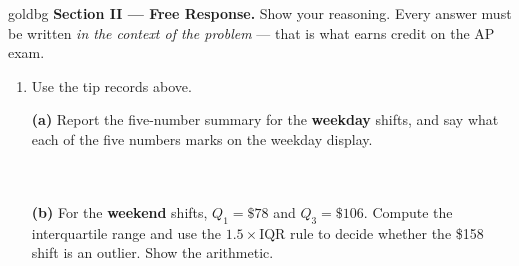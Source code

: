 \documentclass[12pt]{article}
\begin{document}
\vspace{0.14in}

\boxguard[26]
\begin{headlinebox}{goldbg}
\small
\textbf{Section II --- Free Response.} Show your reasoning. Every answer must be written
\emph{in the context of the problem} --- that is what earns credit on the AP exam.
\end{headlinebox}

\vspace{0.10in}

\begin{enumerate}[leftmargin=1.9em, itemsep=0.16in, resume]

  \boxguard[20]
  \item Use the tip records above.

        \boxguard[17]
        \vspace{6pt}
        \textbf{(a)} Report the five-number summary for the \textbf{weekday} shifts, and say what
        each of the five numbers marks on the weekday display.\\[4pt]
        \\[1pt]
        \\

        \boxguard[17]
        \vspace{6pt}
        \textbf{(b)} For the \textbf{weekend} shifts, $Q_1 = \$78$ and $Q_3 = \$106$. Compute the
        interquartile range and use the $1.5 \times \text{IQR}$ rule to decide whether the \$158
        shift is an outlier. Show the arithmetic.\\[4pt]
        \\[1pt]
        \\[1pt]
        \\


\end{enumerate}
\end{document}
